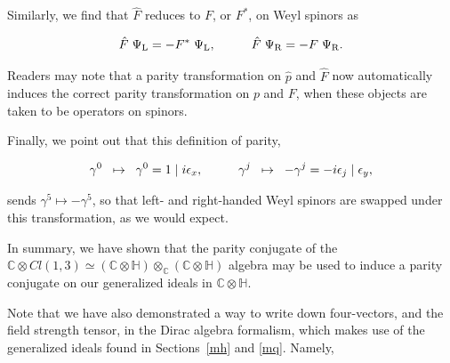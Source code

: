 \documentclass[letterpaper,12pt,titlepage,oneside,final]{book}
\newcommand{\C}{\mathbb{C}}
\newcommand{\CH}{\mathbb{C}\otimes\mathbb{H}}
\begin{document}


\noindent Similarly, we find that $\hat{F}$ reduces to $F$, or $F^*$, on Weyl spinors as

\begin{equation}\hat{F}\hspace{1mm}\Psi_{\textup{L}} =-F^*\hspace{1mm}\Psi_{\textup{L}}, \hspace{1cm} \hat{F}\hspace{1mm}\Psi_{\textup{R}} =-F\hspace{1mm}\Psi_{\textup{R}}.
\end{equation}

\noindent Readers may note that a parity transformation on $\hat{p}$ and $\hat{F}$ now automatically induces the correct parity transformation on $p$ and $F$, when these objects are taken to be operators on spinors.


Finally, we point out that this definition of parity, 

\begin{equation} \gamma^0\hspace{2mm}\mapsto\hspace{2mm}\gamma^0 = 1\hspace{1mm}|\hspace{1mm}i\epsilon_x,\hspace{1cm} \gamma^j\hspace{2mm}\mapsto\hspace{2mm}-\gamma^j = -i\epsilon_j \hspace{1mm}| \hspace{1mm}\epsilon_y,
\end{equation}

\noindent sends $\gamma^5 \mapsto -\gamma^5$, so that left- and right-handed Weyl spinors are swapped under this transformation, as we would expect.

\medskip

In summary, we have shown that the parity conjugate of the  $\C\otimes Cl(1,3) \simeq \left(\CH\right)\otimes_{\C}\left(\CH\right)$ algebra may be used to induce a parity conjugate on our  generalized ideals in $\CH$.   

Note that we have also demonstrated a way to write down four-vectors, and the field strength tensor, in the Dirac algebra formalism, which makes use of the generalized ideals found in Sections~\ref{mh} and \ref{mq}.  Namely, 
\end{document}
